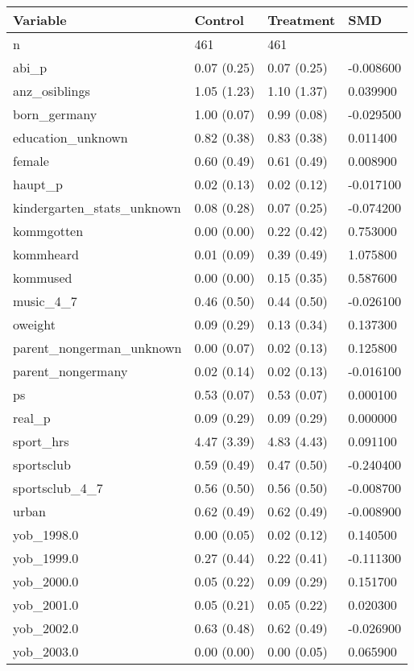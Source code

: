 \begin{tabular}{llll}
\toprule
Variable & Control & Treatment & SMD \\
\midrule
n & 461 & 461 &  \\
abi\_p & 0.07 (0.25) & 0.07 (0.25) & -0.008600 \\
anz\_osiblings & 1.05 (1.23) & 1.10 (1.37) & 0.039900 \\
born\_germany & 1.00 (0.07) & 0.99 (0.08) & -0.029500 \\
education\_unknown & 0.82 (0.38) & 0.83 (0.38) & 0.011400 \\
female & 0.60 (0.49) & 0.61 (0.49) & 0.008900 \\
haupt\_p & 0.02 (0.13) & 0.02 (0.12) & -0.017100 \\
kindergarten\_stats\_unknown & 0.08 (0.28) & 0.07 (0.25) & -0.074200 \\
kommgotten & 0.00 (0.00) & 0.22 (0.42) & 0.753000 \\
kommheard & 0.01 (0.09) & 0.39 (0.49) & 1.075800 \\
kommused & 0.00 (0.00) & 0.15 (0.35) & 0.587600 \\
music\_4\_7 & 0.46 (0.50) & 0.44 (0.50) & -0.026100 \\
oweight & 0.09 (0.29) & 0.13 (0.34) & 0.137300 \\
parent\_nongerman\_unknown & 0.00 (0.07) & 0.02 (0.13) & 0.125800 \\
parent\_nongermany & 0.02 (0.14) & 0.02 (0.13) & -0.016100 \\
ps & 0.53 (0.07) & 0.53 (0.07) & 0.000100 \\
real\_p & 0.09 (0.29) & 0.09 (0.29) & 0.000000 \\
sport\_hrs & 4.47 (3.39) & 4.83 (4.43) & 0.091100 \\
sportsclub & 0.59 (0.49) & 0.47 (0.50) & -0.240400 \\
sportsclub\_4\_7 & 0.56 (0.50) & 0.56 (0.50) & -0.008700 \\
urban & 0.62 (0.49) & 0.62 (0.49) & -0.008900 \\
yob\_1998.0 & 0.00 (0.05) & 0.02 (0.12) & 0.140500 \\
yob\_1999.0 & 0.27 (0.44) & 0.22 (0.41) & -0.111300 \\
yob\_2000.0 & 0.05 (0.22) & 0.09 (0.29) & 0.151700 \\
yob\_2001.0 & 0.05 (0.21) & 0.05 (0.22) & 0.020300 \\
yob\_2002.0 & 0.63 (0.48) & 0.62 (0.49) & -0.026900 \\
yob\_2003.0 & 0.00 (0.00) & 0.00 (0.05) & 0.065900 \\
\bottomrule
\end{tabular}
